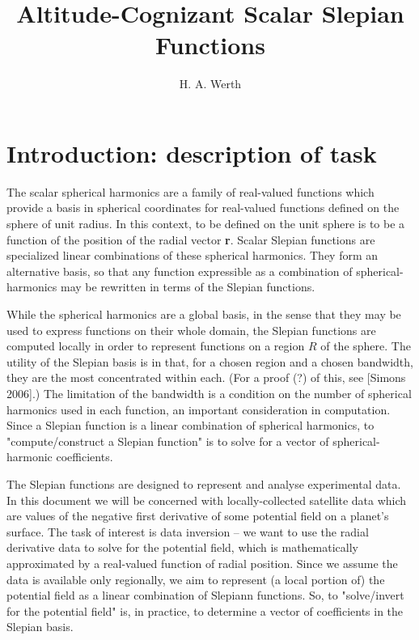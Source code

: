 \documentclass{article}
\title{Altitude-Cognizant Scalar Slepian Functions}
\author{H. A. Werth}
\date{}
\begin{document}
\maketitle

\tableofcontents 


\section{Introduction: description of task}

The scalar spherical harmonics are a family of real-valued functions which provide a basis in spherical coordinates for real-valued functions defined on the sphere of unit radius. In this context, to be defined on the unit sphere is to be a function of the position of the radial vector \textbf{r}. Scalar Slepian functions are specialized linear combinations of these spherical harmonics. They form an alternative basis, so that any function expressible as a combination of spherical-harmonics may be rewritten in terms of the Slepian functions. 

While the spherical harmonics are a global basis, in the sense that they may be used to express functions on their whole domain, the Slepian functions are computed locally in order to represent functions on a region $R$ of the sphere. The utility of the Slepian basis is in that, for a chosen region and a chosen bandwidth, they are the most concentrated within each. (For a proof (?) of this, see [Simons 2006].) The limitation of the bandwidth is a condition on the number of spherical harmonics used in each function, an important consideration in computation. Since a Slepian function is a linear combination of spherical harmonics, to "compute/construct a Slepian function" is to solve for a vector of spherical-harmonic coefficients.

The Slepian functions are designed to represent and analyse experimental data. In this document we will be concerned with locally-collected satellite data which are values of the negative first derivative of some potential field on a planet's surface. The task of interest is data inversion -- we want to use the radial derivative data to solve for the potential field, which is mathematically approximated by a real-valued function of radial position. Since we assume the data is available only regionally, we aim to represent (a local portion of) the potential field as a linear combination of Slepiann functions. So, to "solve/invert for the potential field" is, in practice, to determine a vector of coefficients in the Slepian basis.
\end{document}
